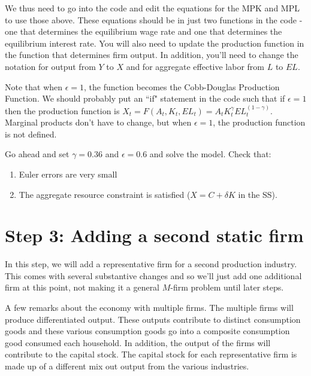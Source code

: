 \documentclass[letterpaper,12pt]{article}
\theoremstyle{definition}
\begin{document}
\begin{spacing}{1.5}
We thus need to go into the code and edit the equations for the MPK and MPL to use those above.  These equations should be in just two functions in the code - one that determines the equilibrium wage rate and one that determines the equilibrium interest rate.  You will also need to update the production function in the function that determines firm output.  In addition, you'll need to change the notation for output from $Y$ to $X$ and for aggregate effective labor from $L$ to $EL$.

%


Note that when $\epsilon = 1$, the function becomes the Cobb-Douglas Production Function.  We should probably put an ``if" statement in the code such that if $\epsilon =1$ then the production function is $X_{t}  = F(A_{t},K_{t},EL_{t})= A_{t}K_{t}^{\gamma}EL_{t}^{(1-\gamma)}$.  Marginal products don't have to change, but when $\epsilon=1$, the production function is not defined.

Go ahead and set $\gamma=0.36$ and $\epsilon=0.6$ and solve the model.  Check that:
\begin{enumerate}
\item Euler errors are very small
\item The aggregate resource constraint is satisfied ($X=C+\delta K$ in the SS).
\end{enumerate}


\section*{Step 3: Adding a second static firm}

In this step, we will add a representative firm for a second production industry.  This comes with several substantive changes and so we'll just add one additional firm at this point, not making it a general $M$-firm problem until later steps.

A few remarks about the economy with multiple firms.  The multiple firms will produce differentiated output.  These outputs contribute to distinct consumption goods and these various consumption goods go into a composite consumption good consumed each household.  In addition, the output of the firms will contribute to the capital stock.  The capital stock for each representative firm is made up of a different mix out output from the various industries.


\end{spacing}
\end{document}
